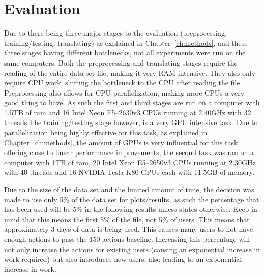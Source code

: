 \chapter{Evaluation}\label{ch:evaluation}

Due to there being three major stages to the evaluation (preprocessing, training/testing, translating) as explained in Chapter~\ref{ch:methods}, and these three stages having different bottlenecks, not all experiments were run on the same computers. Both the preprocessing and translating stages require the reading of the entire data set file, making it very RAM intensive. They also only require CPU work, shifting the bottleneck to the CPU after reading the file. Preprocessing also allows for CPU parallelization, making more CPUs a very good thing to have. As such the first and third stages are run on a computer with 1.5TB of ram and 16 Intel Xeon E5--2630v3 CPUs running at 2.40GHz with 32 threads.The training/testing stage however, is a very GPU intensive task. Due to parallelization being highly effective for this task, as explained in Chapter~\ref{ch:methods}, the amount of GPUs is very influential for this task, offering close to linear performance improvements, the second task was ran on a computer with 1TB of ram, 20 Intel Xeon E5--2650v3 CPUs running at 2.30GHz with 40 threads and 16 NVIDIA Tesla K80 GPUs each with 11.5GB of memory. 

Due to the size of the data set and the limited amount of time, the decision was made to use only 5\% of the data set for plots/results, as such the percentage that has been used will be 5\% in the following results unless states otherwise. Keep in mind that this means the first 5\% of the file, not 5\% of users. This means that approximately 3 days of data is being used. This causes many users to not have enough actions to pass the 150 actions baseline. Increasing this percentage will not only increase the actions for existing users (causing an exponential increase in work required) but also introduces new users, also leading to an exponential increase in work. 

